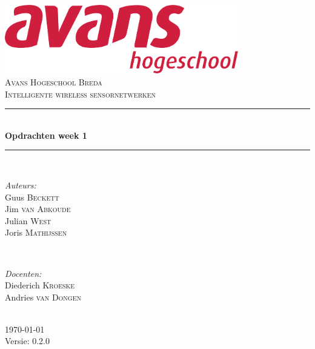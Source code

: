 \documentclass[12pt]{article}
\begin{document}
\begin{titlepage}
\newcommand{\HRule}{\rule{\linewidth}{0.5mm}} %

\center %

\includegraphics[height=3cm] {avans}\\%
\textsc{\Large Avans Hogeschool Breda}\\[0.5cm] %
\textsc{\large Intelligente wireless sensornetwerken }\\[0.5cm] %
\HRule \\[0.4cm]
{ \huge \bfseries Opdrachten week 1}\\[0.4cm] %
\HRule \\[1.5cm]

\begin{minipage}{0.4\textwidth}
\begin{flushleft} \large
\emph{Auteurs:}\\
Guus \textsc{Beckett} \\%
Jim \textsc{van Abkoude} \\
Julian \textsc{West} \\
Joris \textsc{Mathijssen}
\end{flushleft}
\end{minipage}
~
\begin{minipage}{0.4\textwidth}
\begin{flushright} \large
\emph{Docenten:} \\
Diederich \textsc{Kroeske} \\ %
Andries \textsc{van Dongen} \\ %
\end{flushright}
\end{minipage}\\[4cm]

{\large \today}\\[3cm] %

Versie: 0.2.0

\vfill %

\end{titlepage}
\end{document}
